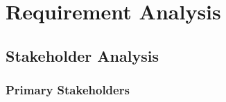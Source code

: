 
\newcommand{\userstory}[4]{%
    \refstepcounter{nuserstory}
    \subsection{#1}
    \label{userstory:\thenuserstory}
    \hangindent=40pt
    \textbf{\textit{As a}} #2,\\
    \textbf{\textit{I want to}} #3,\\
    \textbf{\textit{so that}} #4.
}
\newenvironment{usecase}[1]
{
    \refstepcounter{nusecase}%
    \subsection{Use Case \thenusecase: #1}%
    \label{usecase:\thenusecase}%
}{}


\chapter{Requirement Analysis}
\label{chap:requirement-analysis}

\section{Stakeholder Analysis}
\label{section:stakeholder-analysis}

\subsection{Primary Stakeholders}
\label{subsection:primary-stakeholders}


